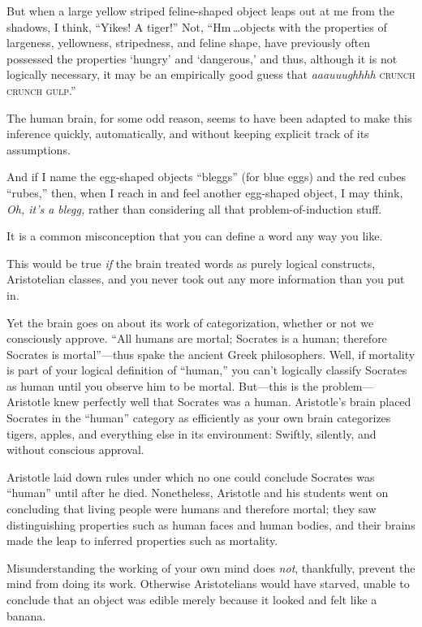 { But when a large yellow striped feline-shaped object leaps out at
me from the shadows, I think, ``Yikes! A
tiger!'' Not, ``Hm\,\ldots objects
with the properties of largeness, yellowness, stripedness, and feline
shape, have previously often possessed the properties
`hungry' and
`dangerous,' and thus, although it is
not logically necessary, it may be an empirically good guess that
\textit{aaauuughhhh} \textsc{crunch crunch gulp}.''


 The human brain, for some odd reason, seems to have been adapted
to make this inference quickly, automatically, and without keeping
explicit track of its assumptions.


 And if I name the egg-shaped objects
``bleggs'' (for blue eggs) and the
red cubes ``rubes,'' then, when I
reach in and feel another egg-shaped object, I may think, \textit{Oh,
it's a blegg,} rather than considering all that
problem-of-induction stuff.


 It is a common misconception that you can define a word any way
you like.


 This would be true \textit{if} the brain treated words as purely
logical constructs, Aristotelian classes, and you never took out any
more information than you put in.


 Yet the brain goes on about its work of categorization, whether or
not we consciously approve. ``All humans are mortal;
Socrates is a human; therefore Socrates is
mortal''---thus spake the ancient Greek philosophers.
Well, if mortality is part of your logical definition of
``human,'' you can't
logically classify Socrates as human until you observe him to be
mortal. But---this is the problem---Aristotle knew perfectly well that
Socrates was a human. Aristotle's brain placed Socrates
in the ``human'' category as
efficiently as your own brain categorizes tigers, apples, and
everything else in its environment: Swiftly, silently, and without
conscious approval.


 Aristotle laid down rules under which no one could conclude
Socrates was ``human'' until after
he died. Nonetheless, Aristotle and his students went on concluding
that living people were humans and therefore mortal; they saw
distinguishing properties such as human faces and human bodies, and
their brains made the leap to inferred properties such as mortality.


 Misunderstanding the working of your own mind does \textit{not},
thankfully, prevent the mind from doing its work. Otherwise
Aristotelians would have starved, unable to conclude that an object was
edible merely because it looked and felt like a banana.


}
